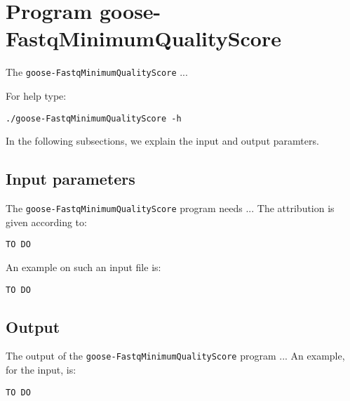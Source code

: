 \section{Program goose-FastqMinimumQualityScore}
The \texttt{goose-FastqMinimumQualityScore} ...

For help type:
\begin{lstlisting}
./goose-FastqMinimumQualityScore -h
\end{lstlisting}
In the following subsections, we explain the input and output paramters.

\subsection{Input parameters}

The \texttt{goose-FastqMinimumQualityScore} program needs ...
The attribution is given according to:
\begin{lstlisting}
TO DO
\end{lstlisting}

An example on such an input file is:
\begin{lstlisting}
TO DO
\end{lstlisting}

\subsection{Output}
The output of the \texttt{goose-FastqMinimumQualityScore} program ...
An example, for the input, is:
\begin{lstlisting}
TO DO
\end{lstlisting}
